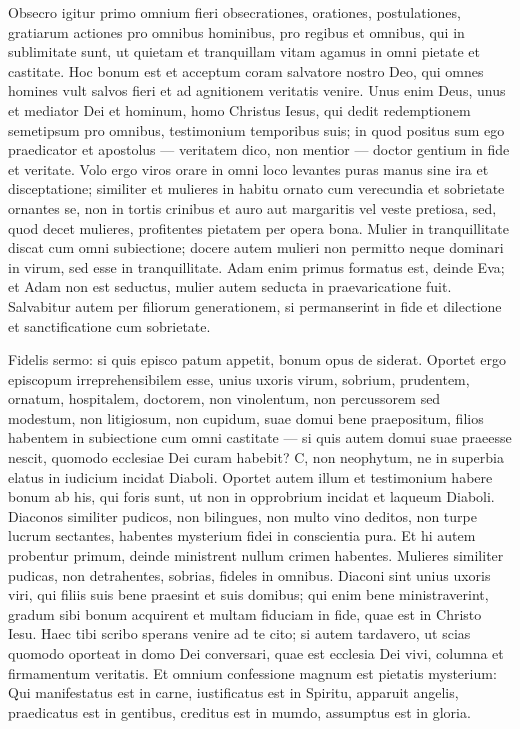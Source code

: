\begin{biblechapter}
\begin{biblechapter}
\verse Obsecro igitur primo omnium fieri obsecrationes, orationes, postulationes, gratiarum actiones pro omnibus hominibus, 
\verse pro regibus et omnibus, qui in sublimitate sunt, ut quietam et tranquillam vitam agamus in omni pietate et castitate. 
\verse Hoc bonum est et acceptum coram salvatore nostro Deo, 
 \verse qui omnes homines vult salvos fieri et ad agnitionem veritatis venire. 
\verse Unus enim Deus, unus et mediator Dei et hominum, homo Christus Iesus, 
 \verse qui dedit redemptionem semetipsum pro omnibus, testimonium temporibus suis; 
\verse in quod positus sum ego praedicator et apostolus — veritatem dico, non mentior — doctor gentium in fide et veritate.
 \verse Volo ergo viros orare in omni loco levantes puras manus sine ira et disceptatione; 
\verse similiter et mulieres in habitu ornato cum verecundia et sobrietate ornantes se, non in tortis crinibus et auro aut margaritis vel veste pretiosa, 
\verse sed, quod decet mulieres, profitentes pietatem per opera bona.
 \verse Mulier in tranquillitate discat cum omni subiectione; 
\verse docere autem mulieri non permitto neque dominari in virum, sed esse in tranquillitate. 
 \verse Adam enim primus formatus est, deinde Eva; 
\verse et Adam non est seductus, mulier autem seducta in praevaricatione fuit. 
\verse Salvabitur autem per filiorum generationem, si permanserint in fide et dilectione et sanctificatione cum sobrietate.
 
\begin{biblechapter}
\verse Fidelis sermo: si quis episco patum appetit, bonum opus de siderat. 
\verse Oportet ergo episcopum irreprehensibilem esse, unius uxoris virum, sobrium, prudentem, ornatum, hospitalem, doctorem, 
\verse non vinolentum, non percussorem sed modestum, non litigiosum, non cupidum, 
\verse suae domui bene praepositum, filios habentem in subiectione cum omni castitate 
\verse — si quis autem domui suae praeesse nescit, quomodo ecclesiae Dei curam habebit? C, 
\verse non neophytum, ne in superbia elatus in iudicium incidat Diaboli. 
 \verse Oportet autem illum et testimonium habere bonum ab his, qui foris sunt, ut non in opprobrium incidat et laqueum Diaboli.
 \verse Diaconos similiter pudicos, non bilingues, non multo vino deditos, non turpe lucrum sectantes, 
\verse habentes mysterium fidei in conscientia pura. 
\verse Et hi autem probentur primum, deinde ministrent nullum crimen habentes. 
 \verse Mulieres similiter pudicas, non detrahentes, sobrias, fideles in omnibus. 
 \verse Diaconi sint unius uxoris viri, qui filiis suis bene praesint et suis domibus; 
\verse qui enim bene ministraverint, gradum sibi bonum acquirent et multam fiduciam in fide, quae est in Christo Iesu.
 \verse Haec tibi scribo sperans venire ad te cito; 
\verse si autem tardavero, ut scias quomodo oporteat in domo Dei conversari, quae est ecclesia Dei vivi, columna et firmamentum veritatis. 
\verse Et omnium confessione magnum est pietatis mysterium:
 Qui manifestatus est in carne,
 iustificatus est in Spiritu,
 apparuit angelis,
 praedicatus est in gentibus,
 creditus est in mumdo,
 assumptus est in gloria.
 

\end{biblechapter}
\end{biblechapter}
\end{biblechapter}
